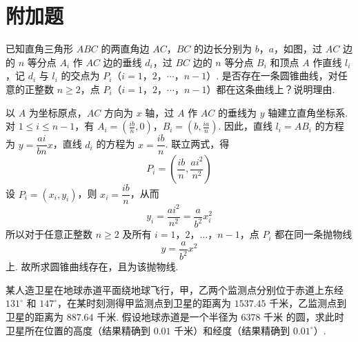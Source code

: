 \section{附加题}

\begin{problem}
已知直角三角形 \(ABC\) 的两直角边 \(AC\)，\(BC\) 的边长分别为 \(b\)，\(a\)，如图，过 \(AC\) 边的 \(n\) 等分点 \(A_{i}\) 作 \(AC\) 边的垂线 \(d_{i}\)，过 \(BC\) 边的 \(n\) 等分点 \(B_{i}\) 和顶点 \(A\) 作直线 \(l_{i}\)，记 \(d_{i}\) 与 \(l_{i}\) 的交点为 \(P_{i}\)（\(i=1\)，\(2\)，\(\cdots\)，\(n-1\)）. 是否存在一条圆锥曲线，对任意的正整数 \(n\ge2\)，点 \(P_{i}\)（\(i=1\)，\(2\)，\(\cdots\)，\(n-1\)）都在这条曲线上？说明理由.

\end{problem}

\begin{solution}
以 \(A\) 为坐标原点，\(AC\) 方向为 \(x\) 轴，过 \(A\) 作 \(AC\) 的垂线为 \(y\) 轴建立直角坐标系. 对 \(1\le i\le n-1\)，有
\(A_i=\left(\frac{ib}{n},0\right)\)，\(B_i=\left(b,\frac{ia}{n}\right)\).
因此，直线 \(l_i=AB_i\) 的方程为 \(y=\dfrac{ai}{bn}x\)，直线 \(d_i\) 的方程为 \(x=\dfrac{ib}{n}\). 联立两式，得
\[
P_i=\left(\frac{ib}{n},\frac{ai^2}{n^2}\right)
\]
设 \(P_i=(x_i,y_i)\)，则 \(x_i=\dfrac{ib}{n}\)，从而
\[
y_i=\frac{ai^2}{n^2}=\frac{a}{b^2}x_i^2
\]
所以对于任意正整数 \(n\ge2\) 及所有 \(i=1\)，\(2\)，\(\ldots\)，\(n-1\)，点 \(P_i\) 都在同一条抛物线
\[
y=\frac{a}{b^2}x^2
\]
上. 故所求圆锥曲线存在，且为该抛物线.
\end{solution}

\begin{problem}
某人造卫星在地球赤道平面绕地球飞行，甲，乙两个监测点分别位于赤道上东经 \(131^{\circ}\) 和 \(147^{\circ}\)，在某时刻测得甲监测点到卫星的距离为 \(1537.45\text{ 千米}\)，乙监测点到卫星的距离为 \(887.64\text{ 千米}\). 假设地球赤道是一个半径为 \(6378\text{ 千米}\) 的圆，求此时卫星所在位置的高度（结果精确到 \(0.01\text{ 千米}\)）和经度（结果精确到 \(0.01^{\circ}\)）.
\end{problem}

